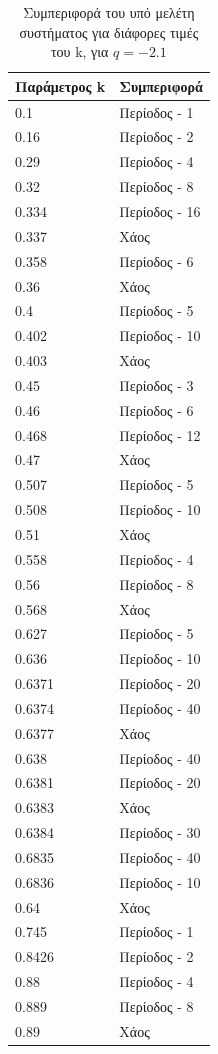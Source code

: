 \begin{table}[ht]
	\centering
	\caption{ Συμπεριφορά του υπό μελέτη συστήματος για διάφορες τιμές του k, για  $q=-2.1$ }
	\label{tab:abc9}
	\begin{tabular}{l | l}
		Παράμετρος k & Συμπεριφορά \\
		\hline
		0.1 &  Περίοδος -  1 \\
		0.16 &  Περίοδος -  2 \\
		0.29& Περίοδος -  4 \\
		0.32& Περίοδος -  8 \\
		0.334 &  Περίοδος -  16 \\
		0.337& Χάος \\
		0.358& Περίοδος -  6 \\
		0.36& Χάος \\
		0.4 &  Περίοδος -  5 \\
		0.402 &  Περίοδος -  10 \\
		0.403 &  Χάος \\
		0.45 &  Περίοδος -  3\\
		0.46 & Περίοδος -  6\\
		0.468 & Περίοδος -  12\\
		0.47 &Χάος\\
		0.507& Περίοδος -  5\\
		0.508 & Περίοδος -  10\\
		0.51 & Χάος\\
		0.558 & Περίοδος -  4\\
		0.56 & Περίοδος -  8\\
		0.568 & Χάος\\
		0.627 & Περίοδος -  5\\
		0.636 & Περίοδος -  10\\
		0.6371 & Περίοδος -  20\\
		0.6374& Περίοδος -  40\\
		0.6377 & Χάος\\
		0.638 &  Περίοδος -  40\\
		0.6381 &  Περίοδος -  20 \\
		0.6383 & Χάος\\
		0.6384 & Περίοδος -  30\\
		0.6835 & Περίοδος -  40\\
		0.6836 & Περίοδος -  10\\
		0.64 & Χάος\\
		0.745& Περίοδος -  1 \\
		0.8426& Περίοδος -  2 \\
		0.88 &  Περίοδος -  4 \\
		0.889& Περίοδος -  8\\
		0.89 &Χάος\\
		
		
	\end{tabular}
	
\end{table}

